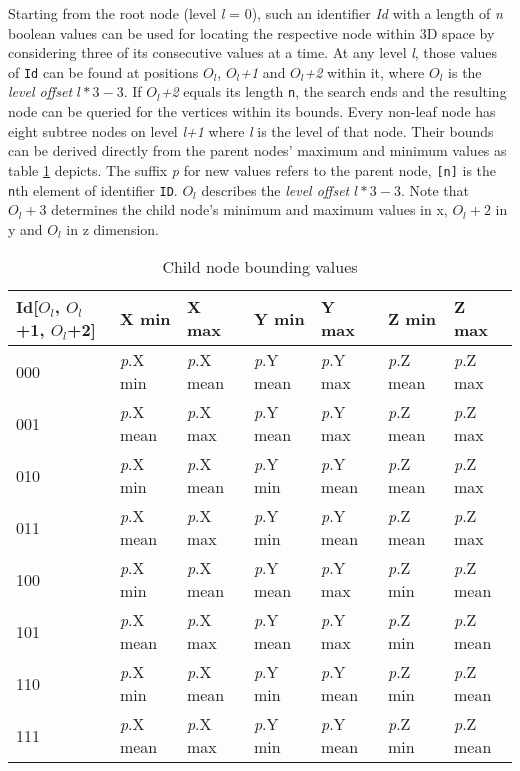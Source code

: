 Starting from the root node (level \textit{l} = 0), such an identifier \textit{Id} with a length of \textit{n} boolean values can be used for locating the respective node within 3D space by considering three of its consecutive values at a time. At any level \textit{l}, those  values of \texttt{Id} can be found at positions \textit{$O_l$}, \textit{$O_l$+1} and \textit{$O_l$+2} within it, where $O_l$ is the \textit{level offset} $l*3-3$. If \textit{$O_l$+2} equals its length \texttt{n}, the search ends and the resulting node can be queried for the vertices within its bounds. Every non-leaf node has eight subtree nodes on level \textit{l+1} where \textit{l} is the level of that node. Their bounds can be derived directly from the parent nodes' maximum and minimum values as table \ref{tab:child_node_bounding_values} depicts. The suffix \textit{p} for new values refers to the parent node, \texttt{[n]} is the \texttt{n}th element of identifier \texttt{ID}. $O_l$ describes the \textit{level offset} $l*3-3$. Note that \texttt{$O_l+3$} determines the child node's minimum and maximum values in x, \texttt{$O_l+2$} in y and \texttt{$O_l$} in z dimension.

\begin{table}[]
\begin{tabular}{l|llllll}
Id{[}$O_l$, $O_l$+1, $O_l$+2{]} & X min & X max & Y min & Y max & Z min & Z max \\ \hline
000 & \textit{p}.X min & \textit{p}.X mean & \textit{p}.Y mean & \textit{p}.Y max & \textit{p}.Z mean & \textit{p}.Z max \\
001 & \textit{p}.X mean & \textit{p}.X max & \textit{p}.Y mean & \textit{p}.Y max & \textit{p}.Z mean & \textit{p}.Z max \\
010 & \textit{p}.X min & \textit{p}.X mean & \textit{p}.Y min & \textit{p}.Y mean & \textit{p}.Z mean & \textit{p}.Z max \\
011 & \textit{p}.X mean & \textit{p}.X max & \textit{p}.Y min & \textit{p}.Y mean & \textit{p}.Z mean & \textit{p}.Z max \\
100 & \textit{p}.X min & \textit{p}.X mean & \textit{p}.Y mean & \textit{p}.Y max & \textit{p}.Z min & \textit{p}.Z mean \\
101 & \textit{p}.X mean & \textit{p}.X max & \textit{p}.Y mean & \textit{p}.Y max & \textit{p}.Z min & \textit{p}.Z mean \\
110 & \textit{p}.X min & \textit{p}.X mean & \textit{p}.Y min & \textit{p}.Y mean & \textit{p}.Z min & \textit{p}.Z mean \\
111 & \textit{p}.X mean & \textit{p}.X max & \textit{p}.Y min & \textit{p}.Y mean & \textit{p}.Z min & \textit{p}.Z mean
\end{tabular}
\caption{Child node bounding values}\label{tab:child_node_bounding_values}
\end{table}

